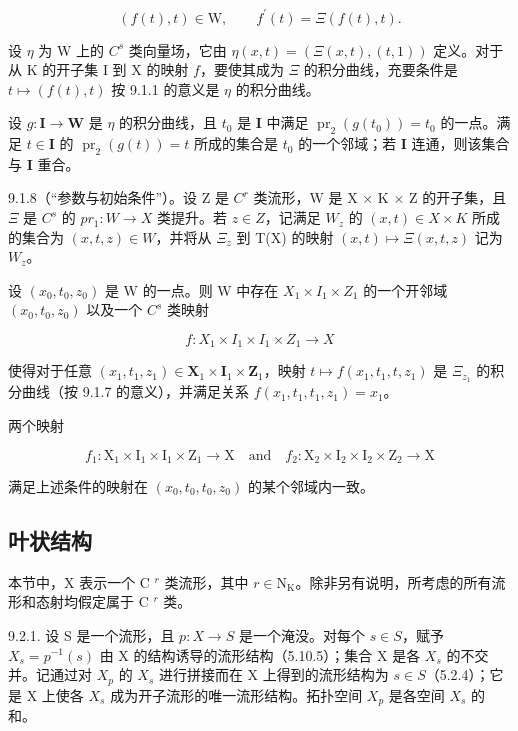 \[
(f (t), t) \in \mathrm{W},\qquad f ^ {\prime} (t) = \Xi (f (t), t).
\]

设 \(\eta\) 为 W 上的 \(C^s\) 类向量场，它由 \(\eta(x, t) = (\Xi(x, t), (t, 1))\) 定义。对于从 K 的开子集 I 到 X 的映射 \(f\)，要使其成为 \(\Xi\) 的积分曲线，充要条件是 \(t \mapsto (f(t), t)\) 按 9.1.1 的意义是 \(\eta\) 的积分曲线。

设 \(g: \mathbf{I} \to \mathbf{W}\) 是 \(\eta\) 的积分曲线，且 \(t_0\) 是 \(\mathbf{I}\) 中满足 \(\operatorname{pr}_2(g(t_0)) = t_0\) 的一点。满足 \(t \in \mathbf{I}\) 的 \(\operatorname{pr}_2(g(t)) = t\) 所成的集合是 \(t_0\) 的一个邻域；若 \(\mathbf{I}\) 连通，则该集合与 \(\mathbf{I}\) 重合。

9.1.8（“参数与初始条件”）。设 Z 是 \(C^{r}\) 类流形，W 是 X × K × Z 的开子集，且 \(\Xi\) 是 \(C^{s}\) 的 \(pr_{1}: W \to X\) 类提升。若 \(z \in Z\)，记满足 \(W_{z}\) 的 \((x, t) \in X \times K\) 所成的集合为 \((x, t, z) \in W\)，并将从 \(\Xi_{z}\) 到 T(X) 的映射 \((x, t) \mapsto \Xi(x, t, z)\) 记为 \(W_{z}\)。

设 \((x_0, t_0, z_0)\) 是 W 的一点。则 W 中存在 \(X_1 \times I_1 \times Z_1\) 的一个开邻域 \((x_0, t_0, z_0)\) 以及一个 \(C^s\) 类映射

\[
f \colon X _ {1} \times I _ {1} \times I _ {1} \times Z _ {1} \rightarrow X
\]

使得对于任意 \((x_{1}, t_{1}, z_{1}) \in \mathbf{X}_{1} \times \mathbf{I}_{1} \times \mathbf{Z}_{1}\)，映射 \(t \mapsto f(x_{1}, t_{1}, t, z_{1})\) 是 \(\Xi_{z_{1}}\) 的积分曲线（按 9.1.7 的意义），并满足关系 \(f(x_{1}, t_{1}, t_{1}, z_{1}) = x_{1}\)。

两个映射

\[
f _ {1}: \mathrm{X} _ {1} \times \mathrm{I} _ {1} \times \mathrm{I} _ {1} \times \mathrm{Z} _ {1} \rightarrow \mathrm{X} \quad \text {and} \quad f _ {2}: \mathrm{X} _ {2} \times \mathrm{I} _ {2} \times \mathrm{I} _ {2} \times \mathrm{Z} _ {2} \rightarrow \mathrm{X}
\]

满足上述条件的映射在 \((x_{0}, t_{0}, t_{0}, z_{0})\) 的某个邻域内一致。

\subsection{叶状结构}

本节中，X 表示一个 C \(^{r}\) 类流形，其中 \(r \in \mathrm{N}_{\mathrm{K}}\)。除非另有说明，所考虑的所有流形和态射均假定属于 C \(^{r}\) 类。

9.2.1. 设 S 是一个流形，且 \(p: X \to S\) 是一个淹没。对每个 \(s \in S\)，赋予 \(X_s = p^{-1}(s)\) 由 X 的结构诱导的流形结构（5.10.5）；集合 X 是各 \(X_s\) 的不交并。记通过对 \(X_p\) 的 \(X_s\) 进行拼接而在 X 上得到的流形结构为 \(s \in S\)（5.2.4）；它是 X 上使各 \(X_s\) 成为开子流形的唯一流形结构。拓扑空间 \(X_p\) 是各空间 \(X_s\) 的和。

